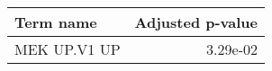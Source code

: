\begin{tabular}{lr}
\toprule
   Term name &  Adjusted p-value \\
\midrule
MEK UP.V1 UP &          3.29e-02 \\
\bottomrule
\end{tabular}
